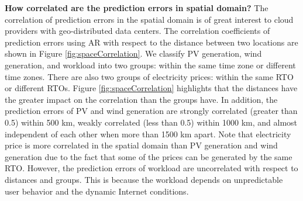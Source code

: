 \textbf{How correlated are the prediction errors in spatial domain?} The correlation of prediction errors in the spatial domain is of great interest to cloud providers with geo-distributed data centers. The correlation coefficients of prediction errors using AR with respect to the distance between two locations are shown in Figure \ref{fig:spaceCorrelation}. We classify PV generation, wind generation, and workload into two groups: within the same time zone or different time zones. There are also two groups of electricity prices: within the same RTO or different RTOs. Figure \ref{fig:spaceCorrelation} highlights that the distances have the greater impact on the correlation than the groups have. In addition, the prediction errors of PV and wind generation are strongly correlated (greater than 0.5) within 500 km, weakly correlated (less than 0.5) within 1000 km, and almost independent of each other when more than 1500 km apart. Note that electricity price is more correlated in the spatial domain than PV generation and wind generation due to the fact that some of the prices can be generated by the same RTO. However, the prediction errors of workload are uncorrelated with respect to distances and groups. This is because the workload depends on unpredictable user behavior and the dynamic Internet conditions.

